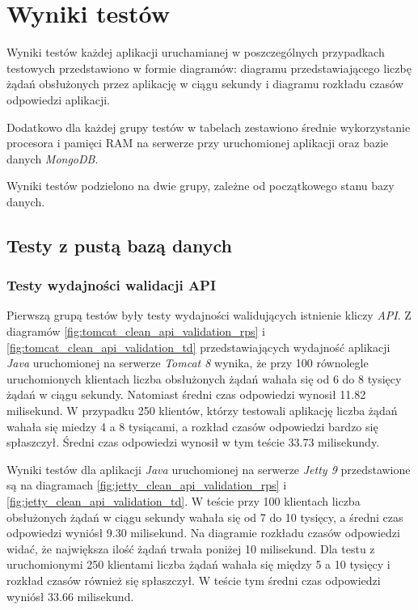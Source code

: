 \chapter{Wyniki testów}
Wyniki testów każdej aplikacji uruchamianej w poszczególnych przypadkach  testowych przedstawiono w formie diagramów: diagramu przedstawiającego liczbę żądań obsłużonych przez aplikację w ciągu sekundy i diagramu rozkładu czasów odpowiedzi aplikacji.

Dodatkowo dla każdej grupy testów w  tabelach zestawiono średnie  wykorzystanie procesora i pamięci RAM na serwerze przy uruchomionej aplikacji oraz bazie danych \textsl{MongoDB}.

Wyniki testów podzielono na dwie grupy, zależne od początkowego stanu bazy danych.

\section{Testy z pustą bazą danych}

\subsection{Testy wydajności walidacji API}
Pierwszą grupą testów były testy wydajności walidujących istnienie kliczy \textsl{API}. Z diagramów \ref{fig:tomcat_clean_api_validation_rps} i \ref{fig:tomcat_clean_api_validation_td} przedstawiających wydajność aplikacji \textsl{Java} uruchomionej na serwerze \textsl{Tomcat 8} wynika, że przy 100 równolegle uruchomionych klientach liczba obsłużonych żądań wahała się od 6 do 8 tysięcy żądań w ciągu sekundy. Natomiast średni czas odpowiedzi wynosił 11.82 milisekund. W przypadku 250 klientów, którzy testowali aplikację liczba żądań wahała się miedzy 4 a 8 tysiącami, a rozkład czasów odpowiedzi bardzo się spłaszczył. Średni czas odpowiedzi wynosił w tym teście 33.73 milisekundy.

Wyniki testów dla aplikacji \textsl{Java} uruchomionej na serwerze \textsl{Jetty 9} przedstawione są na diagramach \ref{fig:jetty_clean_api_validation_rps} i \ref{fig:jetty_clean_api_validation_td}. W teście przy 100 klientach liczba obsłużonych żądań w ciągu sekundy wahała się od 7 do 10 tysięcy, a średni czas odpowiedzi wyniósł 9.30 milisekund. Na diagramie rozkładu czasów odpowiedzi widać, że największa ilość żądań trwała poniżej 10 milisekund. Dla testu z uruchomionymi 250 klientami liczba żądań wahała się między 5 a 10 tysięcy i rozkład czasów również się spłaszczył. W teście tym średni czas odpowiedzi wyniósł 33.66 milisekund. 

